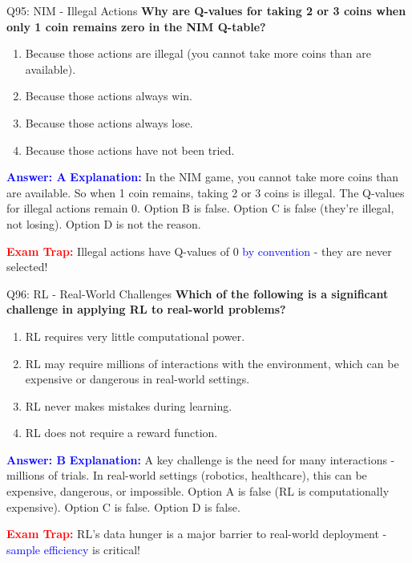 \documentclass[8pt]{beamer}
\begin{document}
	\begin{frame}{Q95: NIM - Illegal Actions}
		\fontsize{6.5}{7.5}\selectfont
		\textbf{Why are Q-values for taking 2 or 3 coins when only 1 coin remains zero in the NIM Q-table?}
		
		\begin{enumerate}
			\item Because those actions are illegal (you cannot take more coins than are available).
			\item Because those actions always win.
			\item Because those actions always lose.
			\item Because those actions have not been tried.
		\end{enumerate}
		
		\vspace{0.1cm}
		\textcolor{blue}{\textbf{Answer: A}}
		\vspace{0.1cm}
		\textcolor{blue}{\textbf{Explanation:}} In the NIM game, you cannot take more coins than are available. So when 1 coin remains, taking 2 or 3 coins is illegal. The Q-values for illegal actions remain 0. Option B is false. Option C is false (they're illegal, not losing). Option D is not the reason.
		
		\textcolor{red}{\textbf{Exam Trap:}} Illegal actions have Q-values of 0 \textcolor{blue}{by convention} - they are never selected!
	\end{frame}
	
	\begin{frame}{Q96: RL - Real-World Challenges}
		\fontsize{6.5}{7.5}\selectfont
		\textbf{Which of the following is a significant challenge in applying RL to real-world problems?}
		
		\begin{enumerate}
			\item RL requires very little computational power.
			\item RL may require millions of interactions with the environment, which can be expensive or dangerous in real-world settings.
			\item RL never makes mistakes during learning.
			\item RL does not require a reward function.
		\end{enumerate}
		
		\vspace{0.1cm}
		\textcolor{blue}{\textbf{Answer: B}}
		\vspace{0.1cm}
		\textcolor{blue}{\textbf{Explanation:}} A key challenge is the need for many interactions - millions of trials. In real-world settings (robotics, healthcare), this can be expensive, dangerous, or impossible. Option A is false (RL is computationally expensive). Option C is false. Option D is false.
		
		\textcolor{red}{\textbf{Exam Trap:}} RL's data hunger is a major barrier to real-world deployment - \textcolor{blue}{sample efficiency} is critical!
	\end{frame}
	
\end{document}
